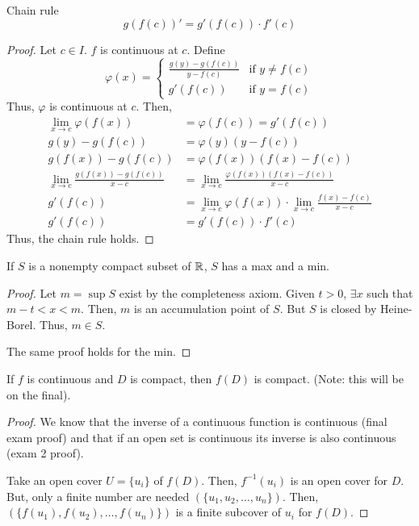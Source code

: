 \begin{theorem}{Chain rule}{}
    $$g(f(c))' = g'(f(c)) \cdot f'(c)$$
\end{theorem}
\begin{proof}
    Let $c \in I$. $f$ is continuous at $c$. Define
    $$\varphi(x) = 
    \begin{cases}
        \frac{g(y) - g(f(c))}{y - f(c)} & \text{if } y \neq f(c) \\
        g'(f(c)) & \text{if } y = f(c)
    \end{cases}$$
    Thus, $\varphi$ is continuous at $c$. Then,
    \begin{align*}
        \lim_{x \to c} \varphi(f(x)) &= \varphi(f(c)) = g'(f(c)) \\
        g(y) - g(f(c)) &= \varphi(y)(y - f(c)) \\
        g(f(x)) - g(f(c)) &= \varphi(f(x))(f(x) - f(c)) \\
        \lim_{x \to c} \frac{g(f(x)) - g(f(c))}{x - c} &= \lim_{x \to c} \frac{\varphi(f(x))(f(x) - f(c))}{x - c} \\
        g'(f(c)) &= \lim_{x \to c} \varphi(f(x)) \cdot \lim_{x \to c} \frac{f(x) - f(c)}{x - c} \\
        g'(f(c)) &= g'(f(c)) \cdot f'(c)
    \end{align*}
    Thus, the chain rule holds.
\end{proof}

\begin{theorem}{}{}
    If $S$ is a nonempty compact subset of $\mathbb{R}$, $S$ has a max and a min.
\end{theorem}
\begin{proof}
    Let $m = \sup S$ exist by the completeness axiom. Given $t > 0$, $\exists x$ such that $m - t < x < m$. Then, $m$ is an accumulation point of $S$. But $S$ is closed by Heine-Borel. Thus, $m \in S$.

    The same proof holds for the min.
\end{proof}

\begin{theorem}{}{}
    If $f$ is continuous and $D$ is compact, then $f(D)$ is compact. (Note: this will be on the final).
\end{theorem}
\begin{proof}
    We know that the inverse of a continuous function is continuous (final exam proof) and that if an open set is continuous its inverse is also continuous (exam 2 proof).
    
    Take an open cover $U = \{u_i\}$ of $f(D)$. Then, $f^{-1}(u_i)$ is an open cover for $D$. But, only a finite number are needed $(\{u_1, u_2, \ldots, u_n\})$. Then, $(\{f(u_1), f(u_2), \ldots, f(u_n)\})$ is a finite subcover of $u_i$ for $f(D)$.
\end{proof}

